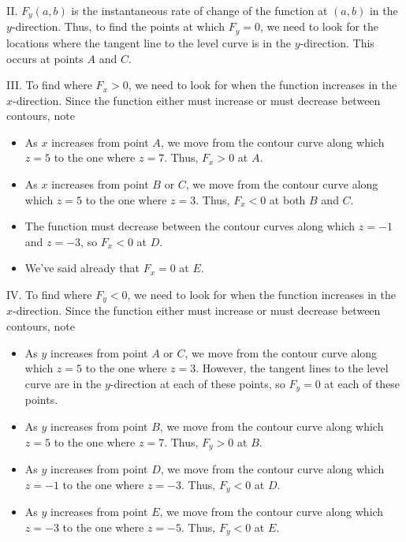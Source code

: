 \documentclass[noauthor,handout]{ximera}
\begin{document}
\begin{problem}
\begin{freeResponse}
II. $F_y(a,b)$ is the instantaneous rate of change of the function at $(a,b)$ in the $y$-direction.  Thus, to find the points at which $F_y=0$, we need to look for the locations where the tangent line to the level curve is in the $y$-direction.  This occurs at points $A$ and $C$.

III. To find where $F_x>0$, we need to look for when the function increases in the $x$-direction.  Since the function either must increase or must decrease between contours, note

\begin{itemize}
\item As $x$ increases from point $A$, we move from the contour curve along which $z=5$ to the one where $z=7$.  Thus, $F_x>0$ at $A$.
\item As $x$ increases from point $B$ or $C$, we move from the contour curve along which $z=5$ to the one where $z=3$.  Thus, $F_x<0$ at both $B$ and $C$.
\item The function must decrease between the contour curves along which $z=-1$ and $z=-3$, so $F_x<0$ at $D$.
\item We've said already that $F_x =0$ at $E$.
\end{itemize}

IV. To find where $F_y<0$, we need to look for when the function increases in the $x$-direction.  Since the function either must increase or must decrease between contours, note

\begin{itemize}
\item As $y$ increases from point $A$ or $C$, we move from the contour curve along which $z=5$ to the one where $z=3$.  However, the tangent lines to the level curve are in the $y$-direction at each of these points, so $F_y=0$ at each of these points.

\item As $y$ increases from point $B$, we move from the contour curve along which $z=5$ to the one where $z=7$.  Thus, $F_y>0$ at $B$.
\item As $y$ increases from point $D$, we move from the contour curve along which $z=-1$ to the one where $z=-3$.  Thus, $F_y<0$ at $D$.
\item As $y$ increases from point $E$, we move from the contour curve along which $z=-3$ to the one where $z=-5$.  Thus, $F_y<0$ at $E$.
\end{itemize}


\end{freeResponse}
\end{problem}
\end{document}
